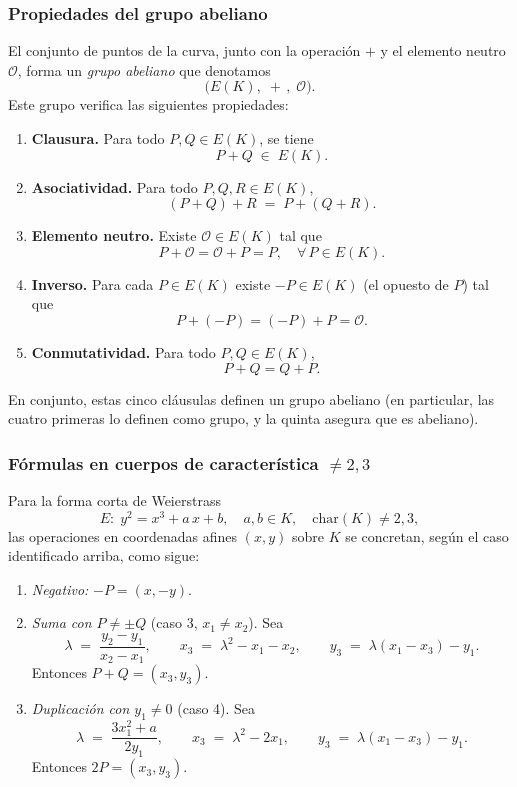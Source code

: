 \subsubsection*{Propiedades del grupo abeliano}
El conjunto de puntos de la curva, junto con la operación $+$ y el elemento neutro $\mathcal{O}$, forma un \emph{grupo abeliano} que denotamos
\[
  \bigl(E(K),\;+\,,\;\mathcal{O}\bigr).
\]
Este grupo verifica las siguientes propiedades:

\begin{enumerate}
  \item \textbf{Clausura.} Para todo $P,Q\in E(K)$, se tiene
    \[
      P + Q \;\in\; E(K).
    \]
  \item \textbf{Asociatividad.} Para todo $P,Q,R\in E(K)$,
    \[
      (P + Q) + R \;=\; P + (Q + R).
    \]
  \item \textbf{Elemento neutro.} Existe $\mathcal{O}\in E(K)$ tal que
    \[
      P + \mathcal{O} = \mathcal{O} + P = P,
      \quad \forall\,P\in E(K).
    \]
  \item \textbf{Inverso.} Para cada $P\in E(K)$ existe $-P\in E(K)$ (el opuesto de $P$)
    tal que
    \[
      P + (-P) = (-P) + P = \mathcal{O}.
    \]
  \item \textbf{Conmutatividad.} Para todo $P,Q\in E(K)$,
    \[
      P + Q = Q + P.
    \]
\end{enumerate}

\noindent En conjunto, estas cinco cláusulas definen un grupo abeliano (en particular, las cuatro primeras lo definen como grupo, y la quinta asegura que es abeliano).

\subsubsection*{Fórmulas en cuerpos de característica \(\neq2,3\)}

Para la forma corta de Weierstrass
\[
  E\colon\;y^2 = x^3 + a\,x + b,
  \quad a,b\in K,
  \quad \mathrm{char}(K)\neq2,3,
\]
las operaciones en coordenadas afines \((x,y)\) sobre \(K\) se concretan, según el caso identificado arriba, como sigue:

\begin{enumerate}
  \item \emph{Negativo:} \(-P = (x,-y)\).
  \item \emph{Suma con \(P\neq\pm Q\)} (caso 3, \(x_1\neq x_2\)). Sea
    \[
      \lambda \;=\; \frac{y_2 - y_1}{x_2 - x_1},
      \qquad
      x_3 \;=\; \lambda^2 - x_1 - x_2,\qquad
      y_3 \;=\; \lambda(x_1 - x_3) - y_1.
    \]
    Entonces \(P + Q = (x_3,y_3)\).
  \item \emph{Duplicación con \(y_1\neq0\)} (caso 4). Sea
    \[
      \lambda \;=\; \frac{3x_1^2 + a}{2y_1},
      \qquad
      x_3 \;=\; \lambda^2 - 2x_1,\qquad
      y_3 \;=\; \lambda(x_1 - x_3) - y_1.
    \]
    Entonces \(2P = (x_3,y_3)\).
\end{enumerate}

